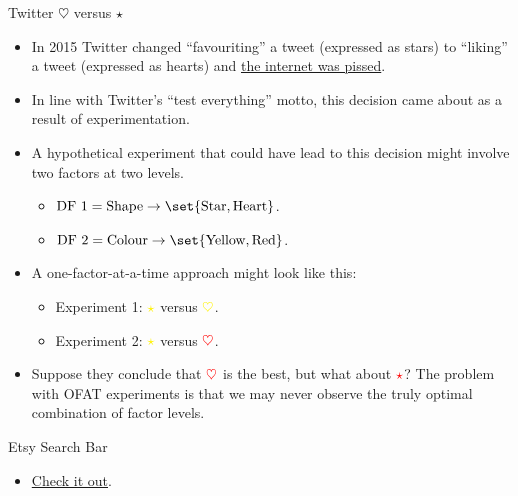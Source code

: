 \begin{Example}{Twitter $ \heartsuit $ versus $ \star $}{}
      \begin{itemize}
            \item In 2015 Twitter changed ``favouriting'' a tweet (expressed as stars) to ``liking'' a tweet (expressed
                  as hearts) and \href{https://entertainment.ie/trending/twitter-changed-their-star-favourites-to-heart-likes-and-the-internet-is-pissed-335920/}{the internet was pissed}.
            \item In line with Twitter's ``test everything'' motto, this decision came about as a result of experimentation.
            \item A hypothetical experiment that could have lead to this decision might involve two factors at two levels.
                  \begin{itemize}
                        \item $ \text{DF 1}=\text{Shape}\to\set{\text{Star},\text{Heart}} $.
                        \item $ \text{DF 2}=\text{Colour}\to\set{\text{Yellow},\text{Red}} $.
                  \end{itemize}
            \item A one-factor-at-a-time approach might look like this:
                  \begin{itemize}
                        \item Experiment 1: $ \color{yellow}\star $ versus $ \color{yellow}\heartsuit $.
                        \item Experiment 2: $ \color{yellow}\star $ versus $ \color{red}\heartsuit $.
                  \end{itemize}
            \item Suppose they conclude that $ \color{red}\heartsuit $ is the best, but what about $ \color{red}\star $?
                  The problem with OFAT experiments is that we may never observe the truly optimal combination of factor levels.
      \end{itemize}
\end{Example}
\begin{Example}{Etsy Search Bar}{}
      \begin{itemize}
            \item \href{https://goodui.org/leaks/how-etsys-product-page-design-evolved-between-2019-and-2020/}{Check it out}.
      \end{itemize}
\end{Example}
